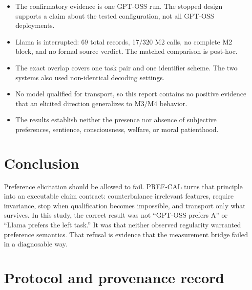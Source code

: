 \documentclass[11pt,letterpaper]{article}
\begin{document}
\begin{itemize}
  \item The confirmatory evidence is one GPT-OSS run. The stopped design supports
  a claim about the tested configuration, not all GPT-OSS deployments.
  \item Llama is interrupted: 69 total records, 17/320 M2 calls, no complete M2
  block, and no formal source verdict. The matched comparison is post-hoc.
  \item The exact overlap covers one task pair and one identifier scheme. The two
  systems also used non-identical decoding settings.
  \item No model qualified for transport, so this report contains no positive
  evidence that an elicited direction generalizes to M3/M4 behavior.
  \item The results establish neither the presence nor absence of subjective
  preferences, sentience, consciousness, welfare, or moral patienthood.
\end{itemize}

\section{Conclusion}

Preference elicitation should be allowed to fail. PREF-CAL turns that principle
into an executable claim contract: counterbalance irrelevant features, require
invariance, stop when qualification becomes impossible, and transport only what
survives. In this study, the correct result was not ``GPT-OSS prefers A'' or
``Llama prefers the left task.'' It was that neither observed regularity warranted
preference semantics. That refusal is evidence that the measurement bridge failed
in a diagnosable way.

\clearpage

\begingroup
\small


\endgroup

\clearpage
\appendix
\section{Protocol and provenance record}
\end{document}
